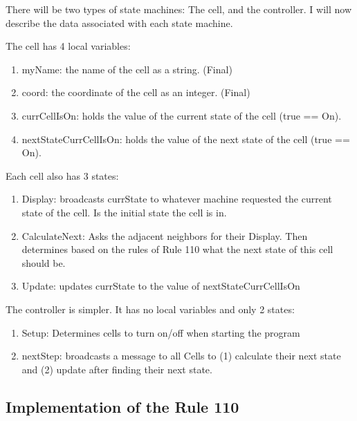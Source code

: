 There will be two types of state machines: The cell, and the controller.
I will now describe the data associated with each state machine.

The cell has 4 local variables:
\begin{enumerate}[leftmargin=4\parindent]
    \item myName: the name of the cell as a string. (Final)
    \item coord: the coordinate of the cell as an integer. (Final)
    \item currCellIsOn: holds the value of the current state of the cell (true == On).
    \item nextStateCurrCellIsOn: holds the value of the next state of the cell (true == On).
\end{enumerate}

Each cell also has 3 states: 
\begin{enumerate}[leftmargin=4\parindent]
    \item Display: broadcasts currState to whatever machine requested the current state of the cell.
    Is the initial state the cell is in.
    \item CalculateNext: Asks the adjacent neighbors for their Display.
    Then determines based on the rules of Rule 110 what the next state of this cell should be.
    \item Update: updates currState to the value of nextStateCurrCellIsOn
\end{enumerate}

The controller is simpler.
It has no local variables and only 2 states:

\begin{enumerate}[leftmargin=4\parindent]
    \item Setup: Determines cells to turn on/off when starting the program
    \item nextStep: broadcasts a message to all Cells to (1) calculate their next state and (2) update after finding their next state.
\end{enumerate}

\subsection{Implementation of the Rule 110}

